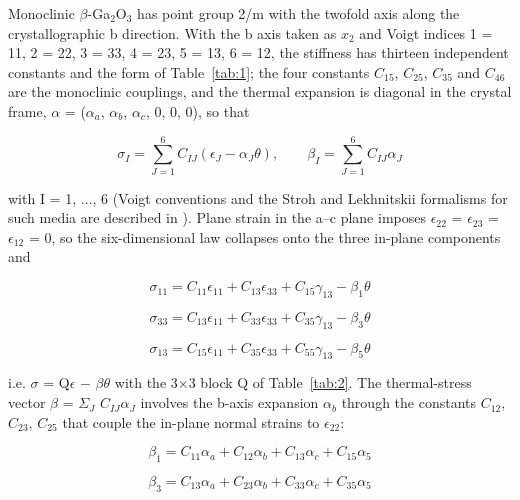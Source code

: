 \documentclass[preprint,12pt]{elsarticle}
\begin{document}
Monoclinic $\beta$-Ga$_2$O$_3$ has point group 2/m with the twofold axis along the crystallographic b direction. With the b axis taken as $x_{2}$ and Voigt indices 1 = 11, 2 = 22, 3 = 33, 4 = 23, 5 = 13, 6 = 12, the stiffness has thirteen independent constants and the form of Table~\ref{tab:1}; the four constants $C_{15}$, $C_{25}$, $C_{35}$ and $C_{46}$ are the monoclinic couplings, and the thermal expansion is diagonal in the crystal frame, $\alpha$ = ($\alpha_{a}$, $\alpha_{b}$, $\alpha_{c}$, 0, 0, 0), so that

\begin{equation}
\sigma_I=\sum_{J=1}^{6}C_{IJ}\left(\epsilon_J-\alpha_J\theta\right),\qquad \beta_I=\sum_{J=1}^{6}C_{IJ}\alpha_J 
\label{eq:10}
\end{equation}

with I = 1, $\ldots$, 6 (Voigt conventions and the Stroh and Lekhnitskii formalisms for such media are described in \cite{ting1996,hwu2010,stroh1958}). Plane strain in the a--c plane imposes $\epsilon_{22}$ = $\epsilon_{23}$ = $\epsilon_{12}$ = 0, so the six-dimensional law collapses onto the three in-plane components and

\begin{equation}
\sigma_{11}=C_{11}\epsilon_{11}+C_{13}\epsilon_{33}+C_{15}\gamma_{13}-\beta_1\theta 
\label{eq:11}
\end{equation}

\begin{equation}
\sigma_{33}=C_{13}\epsilon_{11}+C_{33}\epsilon_{33}+C_{35}\gamma_{13}-\beta_3\theta 
\label{eq:12}
\end{equation}

\begin{equation}
\sigma_{13}=C_{15}\epsilon_{11}+C_{35}\epsilon_{33}+C_{55}\gamma_{13}-\beta_5\theta 
\label{eq:13}
\end{equation}

i.e. $\sigma$ = Q$\epsilon$ $-$ $\beta \theta$ with the 3$\times$3 block Q of Table~\ref{tab:2}. The thermal-stress vector $\beta$ = $\Sigma_{J}$ $C_{IJ}\alpha_{J}$ involves the b-axis expansion $\alpha_{b}$ through the constants $C_{12}$, $C_{23}$, $C_{25}$ that couple the in-plane normal strains to $\epsilon_{22}$:

\begin{equation}
\beta_1=C_{11}\alpha_a+C_{12}\alpha_b+C_{13}\alpha_c+C_{15}\alpha_5 
\label{eq:14}
\end{equation}

\begin{equation}
\beta_3=C_{13}\alpha_a+C_{23}\alpha_b+C_{33}\alpha_c+C_{35}\alpha_5 
\label{eq:15}
\end{equation}
\end{document}
